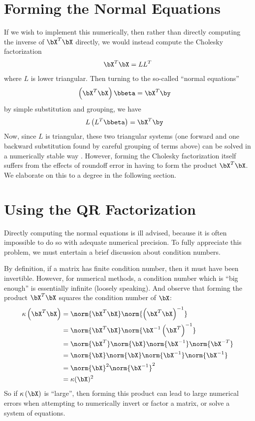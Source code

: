 \section{Forming the Normal Equations}
\label{asec:nrmleq}
If we wish to implement this numerically, then rather than directly computing the inverse of $\bX^T\bX$ directly, we would instead compute the Cholesky factorization
\begin{align*}
\bX^T\bX = LL^T
\end{align*}
where $L$ is lower triangular.  Then turning to the so-called ``normal equations''
\begin{align}
 \left(\bX^T\bX\right)\bbeta &= \bX^T\by\label{math:normeq}
\end{align}
by simple substitution and grouping, we have
\begin{align*}
L\left(L^T\bbeta\right) &= \bX^T\by
\end{align*}
Now, since $L$ is triangular, these two triangular systems (one forward and one backward substitution found by careful grouping of terms above) can be solved in a numerically stable way \citep{numericalstab}.  However, forming the Cholesky factorization itself suffers from the effects of roundoff error in having to form the product $\bX^T\bX$.  We elaborate on this to a degree in the following section.




\section{Using the QR Factorization}
\label{asec:qr}
Directly computing the normal equations is ill advised, because it is often impossible to do so with adequate numerical precision.  To fully appreciate this problem, we must entertain a brief discussion about condition numbers.

By definition, if a matrix has finite condition number, then it must have been invertible.  However, for numerical methods, a condition number which is ``big enough'' is essentially infinite (loosely speaking).  And observe that forming the product $\bX^T\bX$ squares the condition number of $\bX$:
\begin{align*}
\kappa\left(\bX^T\bX\right) &= \norm{\bX^T\bX}\norm{\left(\bX^T\bX\right)^{-1}}\\
  &=\norm{\bX^T\bX} \norm{\bX^{-1}\left(\bX^T\right)^{-1}}\\
  &=\norm{\bX^T} \norm{\bX} \norm{\bX^{-1}} \norm{\bX^{-T}}\\
  &=\norm{\bX} \norm{\bX} \norm{\bX^{-1}} \norm{\bX^{-1}}\\
  &= \norm{\bX}^2 \norm{\bX^{-1}}^2\\
  &=\kappa(\bX)^2
\end{align*}
So if $\kappa\left(\bX\right)$ is ``large'', then forming this product can lead to large numerical errors when attempting to numerically invert or factor a matrix, or solve a system of equations.

